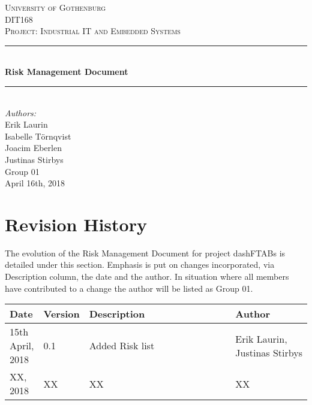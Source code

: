\documentclass[12pt]{article}
\begin{document}
\begin{titlepage}

\newcommand{\Line}{\rule{\linewidth}{0.5mm}} 

\center
 
\textsc{\LARGE University of Gothenburg}
\\[3.5cm] 

\textsc{\Large DIT168}\\[0.3cm]
\textsc{\large Project: Industrial IT and Embedded Systems}\\[0.5cm]

\Line \\[0.4cm]
{\huge \bfseries Risk Management Document}\\[0.4cm]
\Line \\[0.5cm]
 
\Large \textit{Authors:}
\\Erik Laurin
\\Isabelle Törnqvist
\\Joacim Eberlen
\\Justinas Stirbys \\[4cm]

{\large Group 01} \\[0.3cm]
{\large April 16th, 2018}

\vfill

\end{titlepage}

\tableofcontents
\pagebreak


\section{Revision History}
The evolution of the Risk Management Document for project dashFTABs is detailed under this section. Emphasis is put on changes incorporated, via Description column, the date and the author. In situation where all members have contributed to a change the author will be listed as Group 01.
\begin{longtable}{ | p{0.1\linewidth} | l | p{0.6\linewidth} | p{0.3\linewidth} | }\hline 
    
    \textbf{Date} & \textbf{Version} & \textbf{Description} & \textbf{Author} \\ \hline
    15th April, 2018 & 0.1 & Added Risk list & Erik Laurin,  Justinas Stirbys\\ \hline
   	XX, 2018 & XX & XX & XX\\ \hline

\end{longtable}
\pagebreak
\end{document}
